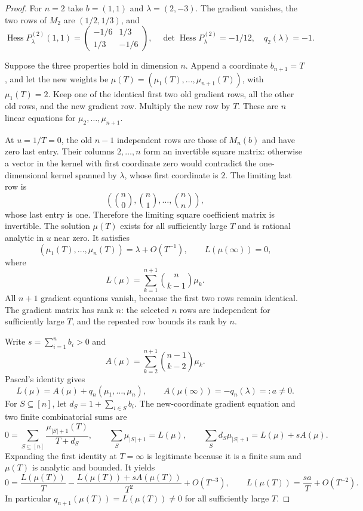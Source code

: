 \documentclass[11pt]{article}
\begin{document}
\begin{proof}
For $n=2$ take $b=(1,1)$ and $\lambda=(2,-3)$. The gradient vanishes,
the two rows of $M_2$ are $(1/2,1/3)$, and
\[
 \operatorname{Hess}P^{(2)}_\lambda(1,1)=
 \begin{pmatrix}-1/6&1/3\\1/3&-1/6\end{pmatrix},
 \quad \det\operatorname{Hess}P^{(2)}_\lambda=-1/12,
 \quad q_2(\lambda)=-1.
\]

Suppose the three properties hold in dimension $n$. Append a coordinate
$b_{n+1}=T$, and let the new weights be
$\mu(T)=(\mu_1(T),\ldots,\mu_{n+1}(T))$, with $\mu_1(T)=2$.
Keep one of the identical first two old gradient rows, all the other old
rows, and the new gradient row. Multiply the new row by $T$. These are $n$
linear equations for $\mu_2,\ldots,\mu_{n+1}$.

At $u=1/T=0$, the old $n-1$ independent rows are those of $M_n(b)$ and have
zero last entry. Their columns $2,\ldots,n$ form an invertible square
matrix: otherwise a vector in the kernel with first coordinate zero would
contradict the one-dimensional kernel spanned by $\lambda$, whose first
coordinate is $2$. The limiting last row is
\[
 \left(\binom n0,\binom n1,\ldots,\binom nn\right),
\]
whose last entry is one. Therefore the limiting square coefficient matrix
is invertible. The solution $\mu(T)$ exists for all sufficiently large $T$
and is rational analytic in $u$ near zero. It satisfies
\[
 (\mu_1(T),\ldots,\mu_n(T))=\lambda+O(T^{-1}),
 \qquad
 L(\mu(\infty))=0,
\]
where
\[
 L(\mu)=\sum_{k=1}^{n+1}\binom n{k-1}\mu_k.
\]
All $n+1$ gradient equations vanish, because the first two rows remain
identical. The gradient matrix has rank $n$: the selected $n$ rows are
independent for sufficiently large $T$, and the repeated row bounds its
rank by $n$.

Write $s=\sum_{i=1}^n b_i>0$ and
\[
 A(\mu)=\sum_{k=2}^{n+1}\binom{n-1}{k-2}\mu_k.
\]
Pascal's identity gives
\[
 L(\mu)=A(\mu)+q_n(\mu_1,\ldots,\mu_n),
 \qquad A(\mu(\infty))=-q_n(\lambda)=:a\ne0.
\]
For $S\subseteq[n]$, let $d_S=1+\sum_{i\in S}b_i$. The new-coordinate
gradient equation and two finite combinatorial sums are
\[
 0=\sum_{S\subseteq[n]}\frac{\mu_{|S|+1}(T)}{T+d_S},
 \qquad
 \sum_S\mu_{|S|+1}=L(\mu),
 \qquad
 \sum_S d_S\mu_{|S|+1}=L(\mu)+sA(\mu).
\]
Expanding the first identity at $T=\infty$ is legitimate because it is a
finite sum and $\mu(T)$ is analytic and bounded. It yields
\[
 0=\frac{L(\mu(T))}{T}
     -\frac{L(\mu(T))+sA(\mu(T))}{T^2}+O(T^{-3}),
 \qquad
 L(\mu(T))=\frac{sa}{T}+O(T^{-2}).
\]
In particular $q_{n+1}(\mu(T))=L(\mu(T))\ne0$ for all sufficiently large
$T$.


\end{proof}
\end{document}
